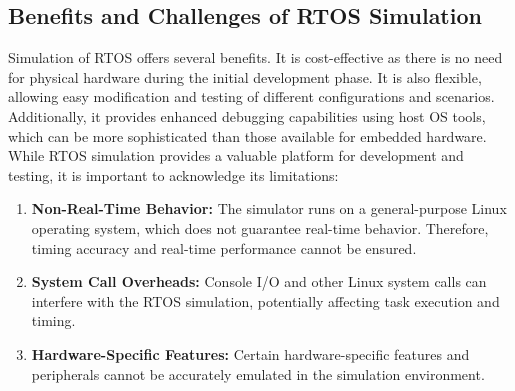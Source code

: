 \subsection{Benefits and Challenges of RTOS Simulation}
Simulation of RTOS offers several benefits. It is cost-effective as there is no need for physical hardware during the initial development phase. It is also flexible, allowing easy modification and testing of different configurations and scenarios. Additionally, it provides enhanced debugging capabilities using host OS tools, which can be more sophisticated than those available for embedded hardware.
While RTOS simulation provides a valuable platform for development and testing, it is important to acknowledge its limitations:
\begin{enumerate}
\item \textbf{Non-Real-Time Behavior: } The simulator runs on a general-purpose Linux operating system, which does not guarantee real-time behavior. Therefore, timing accuracy and real-time performance cannot be ensured.
\item \textbf{System Call Overheads: } Console I/O and other Linux system calls can interfere with the RTOS simulation, potentially affecting task execution and timing.
\item \textbf{Hardware-Specific Features: } Certain hardware-specific features and peripherals cannot be accurately emulated in the simulation environment.
\end{enumerate}